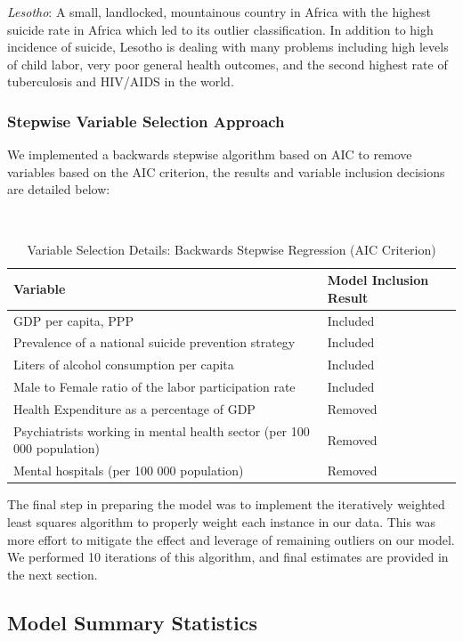 \documentclass[]{article}
\begin{document}
\emph{Lesotho}: A small, landlocked, mountainous country in Africa with
the highest suicide rate in Africa which led to its outlier
classification. In addition to high incidence of suicide, Lesotho is
dealing with many problems including high levels of child labor, very
poor general health outcomes, and the second highest rate of
tuberculosis and HIV/AIDS in the world.

\newpage 

\subsubsection{Stepwise Variable Selection
Approach}\label{stepwise-variable-selection-approach}

We implemented a backwards stepwise algorithm based on AIC to remove
variables based on the AIC criterion, the results and variable inclusion
decisions are detailed below:

\begin{table}[H]
\centering 
\caption{Variable Selection Details: Backwards Stepwise Regression (AIC Criterion)}
\
\begin{tabular}{p{5cm}p{4cm}}  
\hline  
Variable & Model Inclusion Result \\  
\hline
GDP per capita, PPP & Included \\
\hline 
Prevalence of a national suicide prevention strategy & Included \\
\hline 
Liters of alcohol consumption per capita & Included \\
\hline 
Male to Female ratio of the labor participation rate & Included \\
\hline
Health Expenditure as a percentage of GDP & Removed \\
 \hline 
Psychiatrists working in mental health sector (per 100 000 population) & Removed \\   
\hline 
Mental hospitals (per 100 000 population) &  Removed \\
\hline 
\end{tabular} 
\end{table}

The final step in preparing the model was to implement the iteratively
weighted least squares algorithm to properly weight each instance in our
data. This was more effort to mitigate the effect and leverage of
remaining outliers on our model. We performed 10 iterations of this
algorithm, and final estimates are provided in the next section.

\subsection{Model Summary Statistics}\label{model-summary-statistics}
\end{document}
